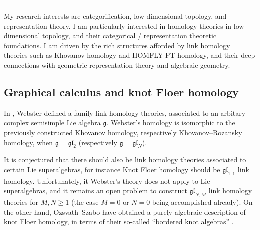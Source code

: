 \documentclass[11pt]{amsart}
\newcommand{\gl}{\mathfrak{gl}}
\begin{document}
%
\thispagestyle{empty}
\vskip5pt
\noindent

\noindent



\hrule
\vskip14pt

My research interests are categorification, low dimensional topology, and representation theory.  I am particularly interested in homology theories in low dimensional topology, and their categorical / representation theoretic foundations.  I am driven by the rich structures afforded by link homology theories such as Khovanov homology and HOMFLY-PT homology, and their deep connections with geometric representation theory and algebraic geometry.



\subsection{Graphical calculus and knot Floer homology}
\label{s:OS}
In \cite{WebsterKIRT}, Webster defined a family link homology theories, associated to an arbitary complex semisimple Lie algebra $\mathfrak{g}$.  Webster's homology is isomorphic to the previously constructed Khovanov homology, respectively Khovanov--Rozansky homology, when $\mathfrak{g}=\gl_2$ (respectively $\mathfrak{g}=\gl_N$).

It is conjectured \cite{DGR} that there should also be link homology theories associated to certain Lie superalgebras, for instance Knot Floer homology should be $\gl_{1,1}$ link homology.  Unfortunately, it Webster's theory does not apply to Lie superalgebras, and it remains an open problem to construct $\gl_{N,M}$ link homology theories for $M,N\geq 1$ (the case $M=0$ or $N=0$ being accomplished already).  On the other hand, Ozsvath--Szabo have obtained a purely algebraic description of knot Floer homology, in terms of their so-called ``bordered knot algebras'' \cite{OSknot1,OSknot2}.  
\end{document}
